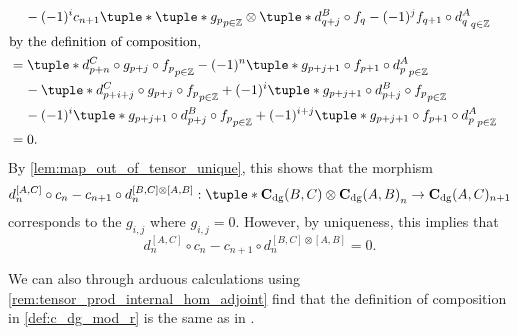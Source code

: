 \begin{remark}
\begin{enumerate}
{\begin{align*}
{                } \\
                &\hspace{0.4cm} - (-1)^i c_{n + 1} \tuple*{
                    \tuple*{ g_p }_{p \in \Zb} \otimes \tuple*{
                        d_{q + j}^B \circ f_q - (-1)^j f_{q + 1} \circ d_q^A
                    }_{q \in \Zb}
                } \\
                \intertext{by the definition of composition,}
                &= \tuple*{
                    d_{p + n}^C \circ g_{p + j} \circ f_p
                }_{p \in \Zb} - (-1)^n \tuple*{
                    g_{p + j + 1} \circ f_{p + 1} \circ d_p^A
                }_{p \in \Zb} \\
                &\hspace{0.4cm} - \tuple*{
                    d_{p + i + j}^C \circ g_{p + j} \circ f_p
                }_{p \in \Zb} + (-1)^i \tuple*{
                    g_{p + j + 1} \circ d_{p + j}^B \circ f_p
                }_{p \in \Zb} \\
                &\hspace{0.4cm} - (-1)^i \tuple*{
                    g_{p + j + 1} \circ d_{p + j}^B \circ f_p
                }_{p \in \Zb} + (-1)^{i + j} \tuple*{
                    g_{p + j + 1} \circ f_{p + 1} \circ d_p^A
                }_{p \in \Zb} \\
                &= 0.
            \end{align*}
            By \autoref{lem:map_out_of_tensor_unique}, this shows that the morphism
            \[
                d_n^{[A, C]} \circ c_n - c_{n + 1} \circ d_n^{[B, C] \otimes [A, B]}: \\
                \tuple*{ \C_{\dg}(B, C) \otimes \C_{\dg}(A, B) }_n \to \C_{\dg}(A, C)_{n + 1}
            \]         
            corresponds to the \( g_{i,j} \) where \( g_{i, j} = 0 \). However, by uniqueness, this implies that
            \[
                d_n^{[A, C]} \circ c_n - c_{n + 1} \circ d_n^{[B, C] \otimes [A, B]} = 0.
            \]
        }
    \end{enumerate}
\end{remark}

We can also through arduous calculations using \autoref{rem:tensor_prod_internal_hom_adjoint} find that the definition of composition in \autoref{def:c_dg_mod_r} is the same as in \cite[p.\ 295]{Borceux_1994}.

